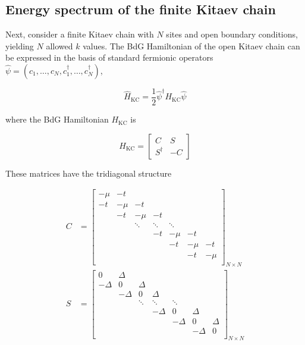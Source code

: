 \subsection{Energy spectrum of the finite Kitaev chain}

Next, consider a finite Kitaev chain with $N$ sites and open boundary conditions, yielding $N$ allowed $k$ values. The BdG Hamiltonian of the open Kitaev chain can be expressed in the basis of standard fermionic operators $\hat{\psi} = (c_{1},\dots,c_{N},c_{1}^{\dagger},\dots,c_{N}^{\dagger})$,

\begin{equation*}
    \hat{H}_{\text{KC}} = \frac{1}{2}\hat{\psi}^{\dagger}H_{\text{KC}}\hat{\psi}     
 \end{equation*}

 where the BdG Hamiltonian $H_{\text{KC}}$ is

 \begin{equation}
     H_{\text{KC}} = \begin{bmatrix}
          C & S \\
          S^{\dagger} & -C   
     \end{bmatrix}     
 \end{equation} 

 These matrices have the tridiagonal structure

\begin{equation}
    \begin{aligned}
        C &= 
        \begin{bmatrix}
        -\mu & -t &  &  &  &  &  \\
        -t & -\mu & -t &  &  &  &  \\
         & -t & -\mu & -t &  &  &  \\
         &  & \ddots & \ddots & \ddots &  &  \\
         &  &  & -t & -\mu & -t &  \\
         &  &  &  & -t & -\mu & -t \\
         &  &  &  &  & -t & -\mu \\
        \end{bmatrix}_{N \times N} \\
        S &= 
        \begin{bmatrix}
        0 & \Delta &  &  &  &  &  \\
        -\Delta & 0 & \Delta &  &  &  &  \\
         & -\Delta & 0 & \Delta &  &  &  \\
         &  & \ddots & \ddots & \ddots &  &  \\
         &  &  & -\Delta & 0 & \Delta &  \\
         &  &  &  & -\Delta & 0 & \Delta \\
         &  &  &  &  & -\Delta & 0 \\              
        \end{bmatrix}_{N \times N}      
    \end{aligned} 
\end{equation}

